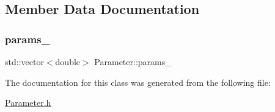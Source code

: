 \subsection{Member Data Documentation}
\hypertarget{class_parameter_abcbcc6573234afb8f6027d3c716917bb}{}\label{class_parameter_abcbcc6573234afb8f6027d3c716917bb} 
\subsubsection{\texorpdfstring{params\+\_\+}{params\_}}
{\footnotesize\ttfamily std\+::vector$<$double$>$ Parameter\+::params\+\_\+\hspace{0.3cm}{\ttfamily [protected]}}



The documentation for this class was generated from the following file\+:\begin{DoxyCompactItemize}
\item 
\hyperlink{_parameter_8h}{Parameter.\+h}\end{DoxyCompactItemize}
